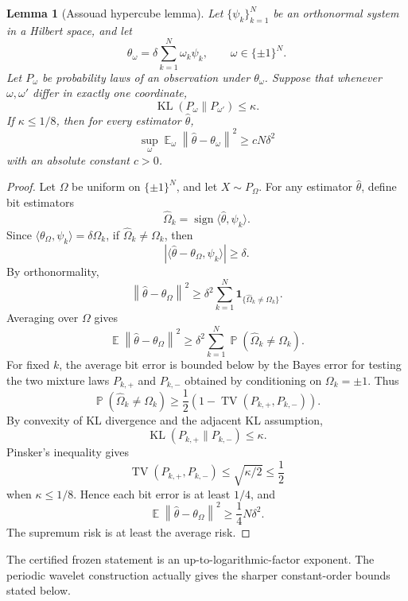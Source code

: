 \documentclass[12pt]{article}
\newtheorem{lemma}[theorem]{Lemma}
\theoremstyle{remark}
\DeclareMathOperator{\E}{\mathbb E}
\DeclareMathOperator{\PP}{\mathbb P}
\DeclareMathOperator{\KL}{KL}
\DeclareMathOperator{\TV}{TV}
\newcommand{\norm}[1]{\left\lVert #1\right\rVert}
\begin{document}
\begin{lemma}[Assouad hypercube lemma]
\label{lem:assouad}
Let \(\{\psi_k\}_{k=1}^N\) be an orthonormal system in a Hilbert space, and let
\[
\theta_\omega=\delta\sum_{k=1}^N\omega_k\psi_k,
\qquad
\omega\in\{\pm1\}^N.
\]
Let \(P_\omega\) be probability laws of an observation under \(\theta_\omega\). Suppose that whenever \(\omega,\omega'\) differ in exactly one coordinate,
\[
\KL(P_\omega\|P_{\omega'})\le\kappa.
\]
If \(\kappa\le1/8\), then for every estimator \(\widehat\theta\),
\[
\sup_{\omega}\E_\omega\norm{\widehat\theta-\theta_\omega}^2
\ge
cN\delta^2
\]
with an absolute constant \(c>0\).
\end{lemma}
\begin{proof}
Let \(\Omega\) be uniform on \(\{\pm1\}^N\), and let \(X\sim P_\Omega\). For any estimator \(\widehat\theta\), define bit estimators
\[
\widehat\Omega_k=\operatorname{sign}\langle\widehat\theta,\psi_k\rangle.
\]
Since \(\langle\theta_\Omega,\psi_k\rangle=\delta\Omega_k\), if \(\widehat\Omega_k\neq\Omega_k\), then
\[
|\langle\widehat\theta-\theta_\Omega,\psi_k\rangle|\ge\delta.
\]
By orthonormality,
\[
\norm{\widehat\theta-\theta_\Omega}^2
\ge
\delta^2\sum_{k=1}^N\mathbf 1_{\{\widehat\Omega_k\neq\Omega_k\}}.
\]
Averaging over \(\Omega\) gives
\[
\E\norm{\widehat\theta-\theta_\Omega}^2
\ge
\delta^2\sum_{k=1}^N\PP(\widehat\Omega_k\neq\Omega_k).
\]
For fixed \(k\), the average bit error is bounded below by the Bayes error for testing the two mixture laws \(P_{k,+}\) and \(P_{k,-}\) obtained by conditioning on \(\Omega_k=\pm1\). Thus
\[
\PP(\widehat\Omega_k\neq\Omega_k)
\ge
\frac12\left(1-\TV(P_{k,+},P_{k,-})\right).
\]
By convexity of KL divergence and the adjacent KL assumption,
\[
\KL(P_{k,+}\|P_{k,-})\le\kappa.
\]
Pinsker's inequality \cite{Tsybakov} gives
\[
\TV(P_{k,+},P_{k,-})
\le
\sqrt{\kappa/2}
\le
\frac12
\]
when \(\kappa\le1/8\). Hence each bit error is at least \(1/4\), and
\[
\E\norm{\widehat\theta-\theta_\Omega}^2
\ge
\frac14N\delta^2.
\]
The supremum risk is at least the average risk.
\end{proof}

The certified frozen statement is an up-to-logarithmic-factor exponent. The periodic wavelet construction actually gives the sharper constant-order bounds stated below.
\end{document}
